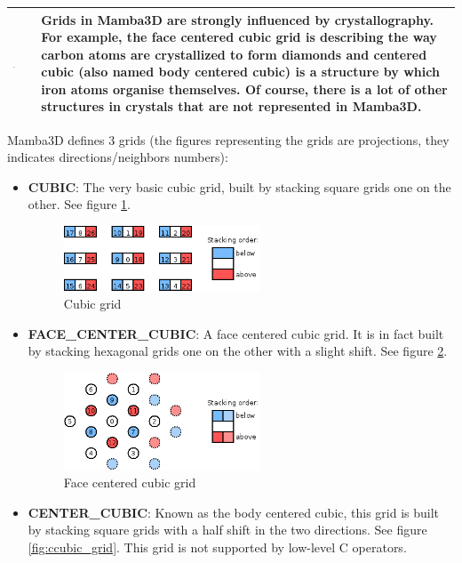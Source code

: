 \documentclass[a4paper,10pt,oneside]{article}
\newenvironment{tipBox}
{
    \begin{center}
    \begin{tabular}{ | b{0.1\textwidth} b{0.8\textwidth} | }
    \hline
    \rowcolor{lightblue}
    \includegraphics[width=0.1\textwidth]{Crystal_Clear_action_info.png} &
}
{
    \\
    \hline
    \end{tabular}
    \end{center}
}
\begin{document}
\begin{tipBox}
Grids in Mamba3D are strongly influenced by crystallography. For example,
the face centered cubic grid is describing the way carbon atoms are 
crystallized to form diamonds and centered cubic (also named body centered
cubic) is a structure by which iron atoms organise themselves. Of course, there
is a lot of other structures in crystals that are not represented in Mamba3D.
\end{tipBox}

Mamba3D defines 3 grids (the figures representing the grids are projections,
they indicates directions/neighbors numbers):

\begin{itemize}
\item \textbf{CUBIC}: The very basic cubic grid, built by stacking square
grids one on the other. See figure \ref{fig:cubic_grid}.

\begin{figure}
\centering
\includegraphics[width=0.55\textwidth]{cubic_grid.png}
\caption{Cubic grid}
\label{fig:cubic_grid}
\end{figure}

\item \textbf{FACE\_CENTER\_CUBIC}: A face centered cubic grid. It is in fact
built by stacking hexagonal grids one on the other with a slight shift. See
figure \ref{fig:fcc_grid}.

\begin{figure}
\centering
\includegraphics[width=0.55\textwidth]{fcc_grid.png}
\caption{Face centered cubic grid}
\label{fig:fcc_grid}
\end{figure}

\item \textbf{CENTER\_CUBIC}: Known as the body centered cubic, this grid is
built by stacking square grids with a half shift in the two directions. See
figure \ref{fig:ccubic_grid}. This grid is not supported by low-level C
operators.


\end{itemize}
\end{document}
